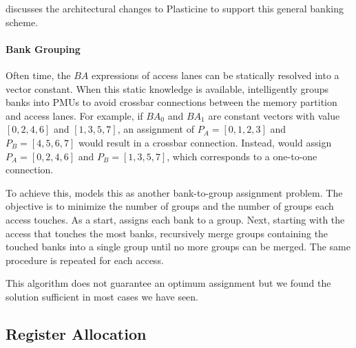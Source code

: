  discusses the architectural changes to Plasticine to support this general
banking scheme.

\paragraph{Bank Grouping}
Often time, the $BA$ expressions of access lanes can be statically resolved into a vector constant. 
When this static knowledge is available, \name intelligently groups banks into PMUs to avoid
crossbar connections between the memory partition and access lanes.
For example, if $BA_0$ and $BA_1$ are constant vectors with value $[0,2,4,6]$ and $[1,3,5,7]$, an
assignment of $P_A=[0,1,2,3]$ and $P_B=[4,5,6,7]$ would result in a crossbar connection.
Instead, \name would assign $P_A=[0,2,4,6]$ and $P_B=[1,3,5,7]$, which corresponds to a one-to-one
connection.

To achieve this, \name models this as another bank-to-group assignment problem.
The objective is to minimize the number of groups and the number of groups each access touches.
As a start, \name assigns each bank to a group. 
Next, starting with the access that touches the most banks, \name recursively merge groups
containing the touched banks into a single group until no more groups can be merged.
The same procedure is repeated for each access.

This algorithm does not guarantee an optimum assignment but we found the solution sufficient in
most cases we have seen.

\subsection{Register Allocation} \label{sec:regalloc}

